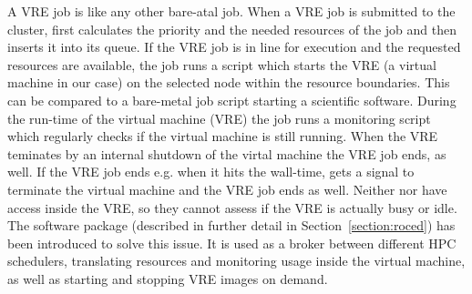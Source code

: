 A VRE job is like any other bare-atal job.
When a VRE job is submitted to the \NEMO cluster, \Moab first calculates the
priority and the needed resources of the job and then inserts it into its queue.
If the VRE job is in line for execution and the requested resources are available,
the job runs a script which starts the VRE (a virtual machine in our case) on the selected node
within the resource boundaries. This can be compared to a bare-metal job script starting a scientific software.
During the run-time of the virtual machine (VRE) the job runs a monitoring
script which regularly checks if the virtual machine is still running.
When the VRE teminates by an internal shutdown of the virtal machine the VRE job ends, as well.
If the VRE job ends e.g. when it hits the wall-time, \Openstack gets a signal to terminate the virtual machine and
the VRE job ends as well. Neither \Moab nor \Openstack have access
inside the VRE, so they cannot assess if the VRE is actually busy or
idle.
The software package \Roced (described in
further detail in Section~\ref{section:roced}) has been introduced to
solve this issue.
It is used as a broker between
different HPC schedulers,  translating resources and monitoring usage inside the
virtual machine, as well as starting and stopping VRE images on demand.
